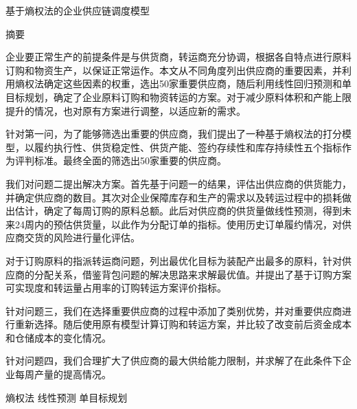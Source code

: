 \documentclass{my_paper}
\newcommand{\lunwenbiaoti}{\fontsize{15.75pt}{0}\heiti 基于熵权法的企业供应链调度模型}
\newcommand{\zhaiyao}{\fontsize{14pt}{0}\heiti 摘要}
\begin{document}
\newpage
\begin{center}
\lunwenbiaoti

\vspace{2ex}
\zhaiyao
\end{center}

企业要正常生产的前提条件是与供货商，转运商充分协调，根据各自特点进行原料订购和物资生产，以保证正常运作。本文从不同角度列出供应商的重要因素，并利用熵权法确定这些因素的权重，选出50家重要供应商，随后利用线性回归预测和单目标规划，确定了企业原料订购和物资转运的方案。对于减少原料体积和产能上限提升的情况，也对原有方案进行调整，以适应新的需求。

针对第一问，为了能够筛选出重要的供应商，我们提出了一种基于熵权法的打分模型，以履约执行性、供货稳定性、供货产能、签约存续性和库存持续性五个指标作为评判标准。最终全面的筛选出50家重要的供应商。

我们对问题二提出解决方案。首先基于问题一的结果，评估出供应商的供货能力，并确定供应商的数目。其次对企业保障库存和生产的需求以及转运过程中的损耗做出估计，确定了每周订购的原料总额。此后对供应商的供货量做线性预测，得到未来24周内的预估供货量，以此作为分配订单的指标。使用历史订单履约情况，对供应商交货的风险进行量化评估。

对于订购原料的指派转运商问题，列出最优化目标为装配产出最多的原料，针对供应商的分配关系，借鉴背包问题的解决思路来求解最优值。并提出了基于订购方案可实现度和转运量占用率的订购转运方案评价指标。

针对问题三，我们在选择重要供应商的过程中添加了类别优势，并对重要供应商进行重新选择。随后使用原有模型计算订购和转运方案，并比较了改变前后资金成本和仓储成本的变化情况。

针对问题四，我们合理扩大了供应商的最大供给能力限制，并求解了在此条件下企业每周产量的提高情况。
\begin{guanjianci}
 熵权法 \quad 线性预测 \quad 单目标规划
\end{guanjianci}
\end{document}
